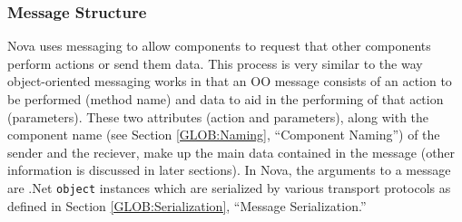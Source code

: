\documentclass[a4paper,12pt]{article}
\begin{document}
\subsubsection{Message Structure}
\label{SEC:ARCH:Messaging;Structure}
Nova uses messaging to allow components to request that other components perform actions or send them data. This process is very similar to the way object-oriented messaging works in that an OO message consists of an action to be performed (method name) and data to aid in the performing of that action (parameters). These two attributes (action and parameters), along with the component name (see Section \ref{GLOB:Naming}, ``Component Naming'') of the sender and the reciever, make up the main data contained in the message (other information is discussed in later sections). In Nova, the arguments to a message are .Net \lstinline!object! instances which are serialized by various transport protocols as defined in Section \ref{GLOB:Serialization}, ``Message Serialization.''
\end{document}
